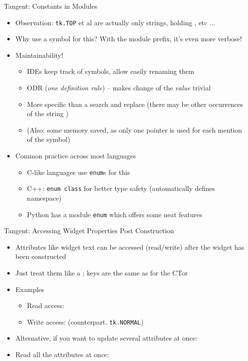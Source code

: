 
\begin{frame}{Tangent: Constants in Modules}
%
\begin{itemize}
\item Observation: \texttt{tk.TOP} et al are actually only strings, holding , etc ...
\item Why use a symbol for this? With the module prefix, it's even more verbose!
\item Maintainability!
	\begin{itemize}
	 \item IDEs keep track of symbols, allow easily renaming them
	 \item ODR (\emph{one definition rule}) -- makes change of the \emph{value} trivial
	 \item More specific than a search and replace (there may be other occurrences of the string )
	 \item (Also: some memory saved, as only one pointer is used for each mention of the symbol)
	 \end{itemize} 
\item Common practice across most languages
	\begin{itemize}
	\item C-like languages use \texttt{enum}s for this
	\item C++: \texttt{enum class} for better type safety (\zB automatically defines namespace)
	\item Python has a module \texttt{enum} which offers some neat features
	\end{itemize}
\end{itemize}
%
\end{frame}


\begin{frame}[fragile]{Tangent: Accessing Widget Properties Post Construction}
%
\begin{itemize}
\item Attributes like widget text can be accessed (read/write) after the widget has been constructed
\item Just treat them like a ; keys are the same as for the CTor
\item Examples
	\begin{itemize}
	\item Read access: 
	\item Write access:  (counterpart. \texttt{tk.NORMAL})
	\end{itemize}
\item Alternative, if you want to update several attributes at once: 
\item Read all the attributes at once: 
\end{itemize}
%
\end{frame}

